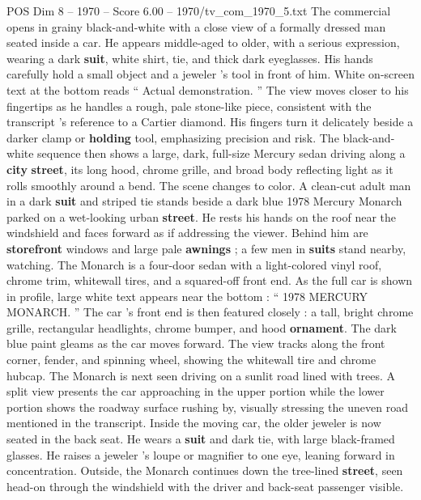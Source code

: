 \begin{textsample}{POS Dim 8 – 1970 – Score 6.00 – 1970/tv\_com\_1970\_5.txt}  \label{ex:f8_pos_036}
The commercial opens in grainy black-and-white with a close view of a formally dressed man seated inside a car.
He appears middle-aged to older, with a serious expression, wearing a dark \textbf{suit}, white shirt, tie, and thick dark eyeglasses.
His hands carefully hold a small object and a jeweler ’s tool in front of him.
White on-screen text at the bottom reads “ Actual demonstration. ” The view moves closer to his fingertips as he handles a rough, pale stone-like piece, consistent with the transcript ’s reference to a Cartier diamond.
His fingers turn it delicately beside a darker clamp or \textbf{holding} tool, emphasizing precision and risk.
The black-and-white sequence then shows a large, dark, full-size Mercury sedan driving along a \textbf{city} \textbf{street}, its long hood, chrome grille, and broad body reflecting light as it rolls smoothly around a bend.
The scene changes to color.
A clean-cut adult man in a dark \textbf{suit} and striped tie stands beside a dark blue 1978 Mercury Monarch parked on a wet-looking urban \textbf{street}.
He rests his hands on the roof near the windshield and faces forward as if addressing the viewer.
Behind him are \textbf{storefront} windows and large pale \textbf{awnings} ; a few men in \textbf{suits} stand nearby, watching.
The Monarch is a four-door sedan with a light-colored vinyl roof, chrome trim, whitewall tires, and a squared-off front end.
As the full car is shown in profile, large white text appears near the bottom : “ 1978 MERCURY MONARCH. ” The car ’s front end is then featured closely : a tall, bright chrome grille, rectangular headlights, chrome bumper, and hood \textbf{ornament}.
The dark blue paint gleams as the car moves forward.
The view tracks along the front corner, fender, and spinning wheel, showing the whitewall tire and chrome hubcap.
The Monarch is next seen driving on a sunlit road lined with trees.
A split view presents the car approaching in the upper portion while the lower portion shows the roadway surface rushing by, visually stressing the uneven road mentioned in the transcript.
Inside the moving car, the older jeweler is now seated in the back seat.
He wears a \textbf{suit} and dark tie, with large black-framed glasses.
He raises a jeweler ’s loupe or magnifier to one eye, leaning forward in concentration.
Outside, the Monarch continues down the tree-lined \textbf{street}, seen head-on through the windshield with the driver and back-seat passenger visible.

\end{textsample}
